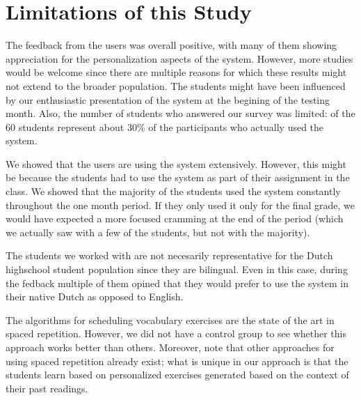 
\section{Limitations of this Study}
\label{sec:limitations}

The feedback from the users was overall positive, with many of them showing appreciation for the personalization aspects of the system. However, more studies would be welcome since there are multiple reasons for which these results might not extend to the broader population. The students might have been influenced by our enthusiastic presentation of the system at the begining of the testing month. Also, the number of students who answered our survey was limited: \surveyrespondents of the 60 students represent about 30\% of the participants who actually used the system.

We showed that the users are using the system extensively. However, this might be because the students had to use the system as part of their assignment in the class. We showed that the majority of the students used the system constantly throughout the one month period. If they only used it only for the final grade, we would have expected a more focused cramming at the end of the period (which we actually saw with a few of the students, but not with the majority). 

The students we worked with are not necesarily representative for the Dutch highschool student population since they are bilingual. Even in this case, during the fedback multiple of them opined that they would prefer to use the system in their native Dutch as opposed to English.


The algorithms for scheduling vocabulary exercises are the state of the art in spaced repetition. However, we did not have a control group to see whether this approach works better than others. Moreover, note that other approaches for using spaced repetition already exist; what is unique in our approach is that the students learn based on personalized exercises generated based on the context of their past readings.




